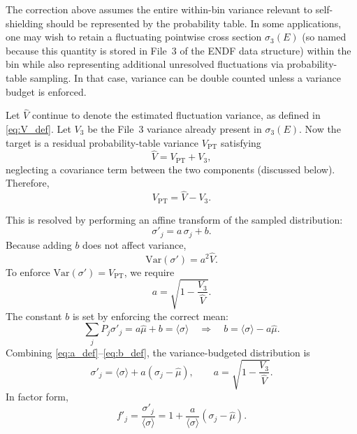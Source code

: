 \documentclass{style/nseJournal}
\newcommand{\sbin}{\langle \sigma \rangle}
\begin{document}
The correction above assumes the entire within-bin variance relevant to self-shielding should be represented by the probability table. In some applications, one may wish to retain a fluctuating pointwise cross section $\sigma_3(E)$ (so named because this quantity is stored in File~3 of the ENDF data structure) within the bin while also representing additional unresolved fluctuations via probability-table sampling. In that case, variance can be double counted unless a variance budget is enforced.

Let $\hat{V}$ continue to denote the estimated fluctuation variance, as defined in \autoref{eq:V_def}. Let $V_3$ be the File~3 variance already present in $\sigma_3(E)$. Now the target is a residual probability-table variance $V_{\mathrm{PT}}$ satisfying
\begin{equation}
\hat{V} = V_{\mathrm{PT}} + V_3,
\label{eq:var_split}
\end{equation}
neglecting a covariance term between the two components (discussed below). Therefore,
\begin{equation}
V_{\mathrm{PT}} = \hat{V} - V_3.
\label{eq:VPT_def}
\end{equation}

This is resolved by performing an affine transform of the sampled distribution:
\begin{equation}
\sigma'_j = a\,\sigma_j + b.
\label{eq:affine_general}
\end{equation}
Because adding $b$ does not affect variance,
\begin{equation}
\mathrm{Var}(\sigma') = a^2 \hat{V}.
\end{equation}
To enforce $\mathrm{Var}(\sigma')=V_{\mathrm{PT}}$, we require
\begin{equation}
a = \sqrt{1-\frac{V_3}{\hat{V}}}.
\label{eq:a_def}
\end{equation}
The constant $b$ is set by enforcing the correct mean:
\begin{equation}
\sum_j P_j\sigma'_j = a\hat{\mu} + b = \sbin
\quad\Rightarrow\quad
b = \sbin-a\hat{\mu}.
\label{eq:b_def}
\end{equation}
Combining \autoref{eq:a_def}--\autoref{eq:b_def}, the variance-budgeted distribution is
\begin{equation}
\sigma'_j = \sbin + a(\sigma_j-\hat{\mu}),
\qquad
a=\sqrt{1-\frac{V_3}{\hat{V}}}.
\label{eq:sigma_prime_budget}
\end{equation}
In factor form,
\begin{equation}
f'_j = \frac{\sigma'_j}{\sbin}
= 1 + \frac{a}{\sbin}(\sigma_j-\hat{\mu}).
\label{eq:fprime_budget}
\end{equation}
\end{document}

